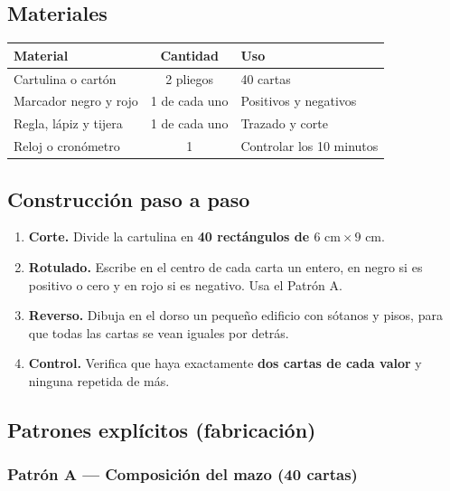 \documentclass[12pt, letterpaper]{article}
\begin{document}
\subsection{Materiales}

\begin{center}
\small
\begin{tabular}{@{}p{5.0cm} c p{7.4cm}@{}}
\toprule
\textbf{Material} & \textbf{Cantidad} & \textbf{Uso}\\
\midrule
Cartulina o cartón & 2 pliegos & 40 cartas\\
Marcador negro y rojo & 1 de cada uno & Positivos y negativos\\
Regla, lápiz y tijera & 1 de cada uno & Trazado y corte\\
Reloj o cronómetro & 1 & Controlar los 10 minutos\\
\bottomrule
\end{tabular}
\end{center}

\subsection{Construcción paso a paso}

\begin{enumerate}[leftmargin=*]
  \item \textbf{Corte.} Divide la cartulina en \textbf{40 rectángulos de $6\text{ cm}\times 9\text{ cm}$}.
  \item \textbf{Rotulado.} Escribe en el centro de cada carta un entero, en negro si es positivo o cero y en rojo si es negativo. Usa el Patrón A.
  \item \textbf{Reverso.} Dibuja en el dorso un pequeño edificio con sótanos y pisos, para que todas las cartas se vean iguales por detrás.
  \item \textbf{Control.} Verifica que haya exactamente \textbf{dos cartas de cada valor} y ninguna repetida de más.
\end{enumerate}

\subsection{Patrones explícitos (fabricación)}

\subsubsection{Patrón A — Composición del mazo (40 cartas)}
\end{document}

